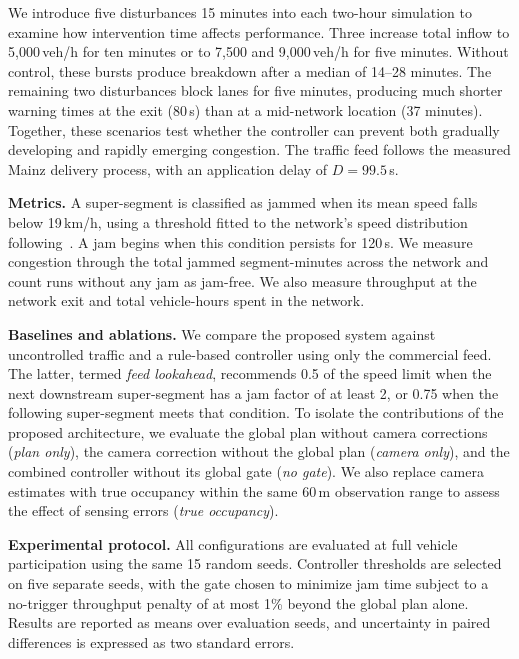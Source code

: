 \documentclass[letterpaper, 10pt, journal, twoside]{IEEEtran}
\begin{document}
We introduce five disturbances 15 minutes into each two-hour simulation to examine how intervention time affects performance. Three increase total inflow to 5,000\,veh/h for ten minutes or to 7,500 and 9,000\,veh/h for five minutes. Without control, these bursts produce breakdown after a median of 14--28 minutes. The remaining two disturbances block lanes for five minutes, producing much shorter warning times at the exit (80\,s) than at a mid-network location (37 minutes). Together, these scenarios test whether the controller can prevent both gradually developing and rapidly emerging congestion. The traffic feed follows the measured Mainz delivery process, with an application delay of $D=99.5$\,s.

\noindent\textbf{Metrics.} A super-segment is classified as jammed when its mean speed falls below 19\,km/h, using a threshold fitted to the network's speed distribution following~\cite{bhardwaj2023understanding}. A jam begins when this condition persists for 120\,s. We measure congestion through the total jammed segment-minutes across the network and count runs without any jam as jam-free. We also measure throughput at the network exit and total vehicle-hours spent in the network.

\noindent\textbf{Baselines and ablations.} We compare the proposed system against uncontrolled traffic and a rule-based controller using only the commercial feed. The latter, termed \emph{feed lookahead}, recommends 0.5 of the speed limit when the next downstream super-segment has a jam factor of at least 2, or 0.75 when the following super-segment meets that condition. To isolate the contributions of the proposed architecture, we evaluate the global plan without camera corrections (\emph{plan only}), the camera correction without the global plan (\emph{camera only}), and the combined controller without its global gate (\emph{no gate}). We also replace camera estimates with true occupancy within the same 60\,m observation range to assess the effect of sensing errors (\emph{true occupancy}).

\noindent\textbf{Experimental protocol.} All configurations are evaluated at full vehicle participation using the same 15 random seeds. Controller thresholds are selected on five separate seeds, with the gate chosen to minimize jam time subject to a no-trigger throughput penalty of at most 1\% beyond the global plan alone. Results are reported as means over evaluation seeds, and uncertainty in paired differences is expressed as two standard errors.
\end{document}
